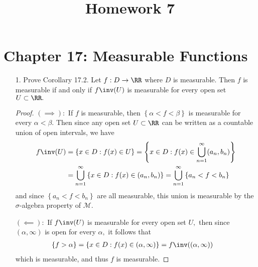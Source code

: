 \documentclass{article}
\begin{document}
\title{Homework 7}
\maketitle
\thispagestyle{fancy}

\section*{Chapter 17: Measurable Functions}

\begin{itemize}
	\item[1.] Prove Corollary 17.2. Let $f:D\to\RR$ where $D$ is measurable. Then $f$ is measurable if and only if $f\inv(U)$ is measurable for every open set $U\subset\RR.$
		\begin{proof}
			$(\implies):$ If $f$ is measurable, then $\left\{ \alpha<f<\beta \right\}$ is measurable for every $\alpha<\beta.$ Then since any open set $U\subset\RR$ can be written as a countable union of open intervals, we have
			\begin{align*}
				f\inv(U) &= \left\{ x\in D: f(x)\in U \right\} = \left\{ x\in D: f(x)\in\bigcup_{n=1}^\infty (a_n, b_n) \right\} \\
				&= \bigcup_{n=1}^\infty \left\{ x\in D: f(x)\in (a_n, b_n) \right\} = \bigcup_{n=1}^\infty \left\{ a_n<f<b_n \right\}
			\end{align*}
			and since $\left\{ a_n<f<b_n \right\}$ are all measurable, this union is measurable by the $\sigma$-algebra property of $\mathcal M.$

			$(\impliedby):$ If $f\inv(U)$ is measurable for every open set $U,$ then since $(\alpha, \infty)$ is open for every $\alpha,$ it follows that
			\begin{align*}
				\left\{ f>\alpha \right\} &= \left\{ x\in D:f(x)\in(\alpha, \infty) \right\} = f\inv( (\alpha, \infty))
			\end{align*}
			which is measurable, and thus $f$ is measurable.
		\end{proof}


\end{itemize}
\end{document}
